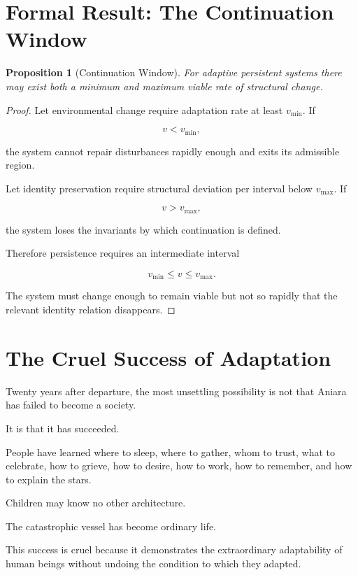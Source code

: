 \documentclass[11pt,oneside]{book}
\newtheorem{proposition}[theorem]{Proposition}
\theoremstyle{definition}
\theoremstyle{remark}
\begin{document}
\section{Formal Result: The Continuation Window}

\begin{proposition}[Continuation Window]
For adaptive persistent systems there may exist both a minimum and maximum viable rate of structural change.
\end{proposition}

\begin{proof}
Let environmental change require adaptation rate at least \(v_{\min}\). If

\[
v<v_{\min},
\]

the system cannot repair disturbances rapidly enough and exits its admissible region.

Let identity preservation require structural deviation per interval below \(v_{\max}\). If

\[
v>v_{\max},
\]

the system loses the invariants by which continuation is defined.

Therefore persistence requires an intermediate interval

\[
v_{\min}\leq v\leq v_{\max}.
\]

The system must change enough to remain viable but not so rapidly that the relevant identity relation disappears.
\end{proof}

\section{The Cruel Success of Adaptation}

Twenty years after departure, the most unsettling possibility is not that Aniara has failed to become a society.

It is that it has succeeded.

People have learned where to sleep, where to gather, whom to trust, what to celebrate, how to grieve, how to desire, how to work, how to remember, and how to explain the stars.

Children may know no other architecture.

The catastrophic vessel has become ordinary life.

This success is cruel because it demonstrates the extraordinary adaptability of human beings without undoing the condition to which they adapted.
\end{document}
